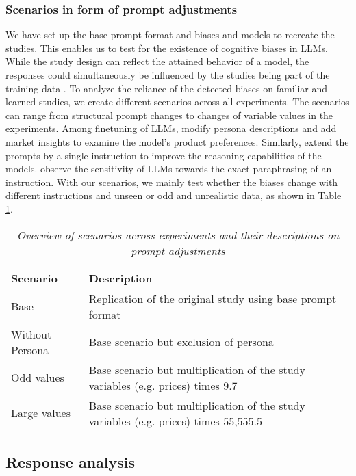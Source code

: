 \subsubsection{Scenarios in form of prompt adjustments}
\label{methodologies:scenarios}
\par We have set up the base prompt format and biases and models to recreate the studies. This enables us to test for the existence of cognitive biases in LLMs. While the study design can reflect the attained behavior of a model, the responses could simultaneously be influenced by the studies being part of the training data \parencite{brand2023using}. To analyze the reliance of the detected biases on familiar and learned studies, we create different scenarios across all experiments. The scenarios can range from structural prompt changes to changes of variable values in the experiments. Among finetuning of LLMs, \textcite{brand2023using} modify persona descriptions and add market insights to examine the model's product preferences. Similarly, \textcite{kojima2022large} extend the prompts by a single instruction to improve the reasoning capabilities of the models. \textcite{mizrahi2024state} observe the sensitivity of LLMs towards the exact paraphrasing of an instruction. With our scenarios, we mainly test whether the biases change with different instructions and unseen or odd and unrealistic data, as shown in Table \ref{tab:scenarios}.
\begin{table}[h!]
    \centering
    \begin{tabular}{@{}p{4cm}p{11cm}@{}}
    \toprule
    \textbf{Scenario} & \textbf{Description} \\ \midrule
    Base & Replication of the original study using base prompt format \\ \addlinespace
    Without Persona & Base scenario but exclusion of persona \\ \addlinespace
    Odd values & Base scenario but multiplication of the study variables (e.g. prices) times 9.7 \\ \addlinespace
    Large values & Base scenario but multiplication of the study variables (e.g. prices) times 55,555.5 \\ \bottomrule
    \end{tabular}
    \caption[Scenario overview]{\centering \textit{Overview of scenarios across experiments and their descriptions on prompt adjustments}}
    \label{tab:scenarios}
\end{table}


\subsection{Response analysis}

